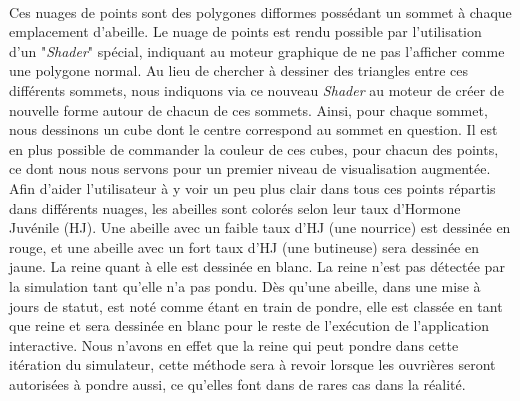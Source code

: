 		\paragraph{}
		Ces nuages de points sont des polygones difformes possédant un sommet à chaque emplacement d'abeille. Le nuage de points est rendu possible par l'utilisation d'un "\textit{Shader}" spécial, indiquant au moteur graphique de ne pas l'afficher comme une polygone normal. Au lieu de chercher à dessiner des triangles entre ces différents sommets, nous indiquons via ce nouveau \textit{Shader} au moteur de créer de nouvelle forme autour de chacun de ces sommets. Ainsi, pour chaque sommet, nous dessinons un cube dont le centre correspond au sommet en question. Il est en plus possible de commander la couleur de ces cubes, pour chacun des points, ce dont nous nous servons pour un premier niveau de visualisation augmentée. Afin d'aider l'utilisateur à y voir un peu plus clair dans tous ces points répartis dans différents nuages, les abeilles sont colorés selon leur taux d'Hormone Juvénile (HJ). Une abeille avec un faible taux d'HJ (une nourrice) est dessinée en rouge, et une abeille avec un fort taux d'HJ (une butineuse) sera dessinée en jaune. La reine quant à elle est dessinée en blanc. La reine n'est pas détectée par la simulation tant qu'elle n'a pas pondu. Dès qu'une abeille, dans une mise à jours de statut, est noté comme étant en train de pondre, elle est classée en tant que reine et sera dessinée en blanc pour le reste de l'exécution de l'application interactive. Nous n'avons en effet que la reine qui peut pondre dans cette itération du simulateur, cette méthode sera à revoir lorsque les ouvrières seront autorisées à pondre aussi, ce qu'elles font dans de rares cas dans la réalité.
		
